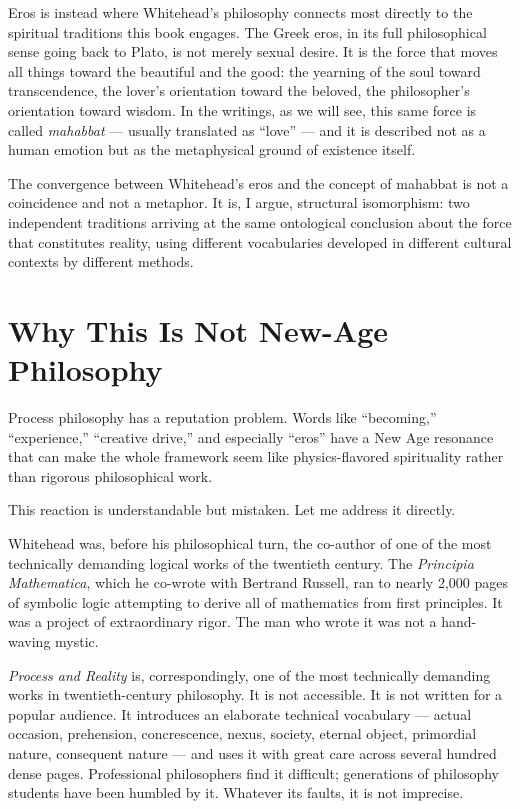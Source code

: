 Eros is instead where Whitehead's philosophy connects most directly to the spiritual traditions this book engages. The Greek eros, in its full philosophical sense going back to Plato, is not merely sexual desire. It is the force that moves all things toward the beautiful and the good: the yearning of the soul toward transcendence, the lover's orientation toward the beloved, the philosopher's orientation toward wisdom. In the \bahai writings, as we will see, this same force is called \textit{mahabbat} --- usually translated as ``love'' --- and it is described not as a human emotion but as the metaphysical ground of existence itself.

The convergence between Whitehead's eros and the \bahai concept of mahabbat is not a coincidence and not a metaphor. It is, I argue, structural isomorphism: two independent traditions arriving at the same ontological conclusion about the force that constitutes reality, using different vocabularies developed in different cultural contexts by different methods.

\section{Why This Is Not New-Age Philosophy}
\label{sec:ch2-not-newage}

Process philosophy has a reputation problem. Words like ``becoming,'' ``experience,'' ``creative drive,'' and especially ``eros'' have a New Age resonance that can make the whole framework seem like physics-flavored spirituality rather than rigorous philosophical work.

This reaction is understandable but mistaken. Let me address it directly.

Whitehead was, before his philosophical turn, the co-author of one of the most technically demanding logical works of the twentieth century. The \textit{Principia Mathematica}, which he co-wrote with Bertrand Russell, ran to nearly 2,000 pages of symbolic logic attempting to derive all of mathematics from first principles. It was a project of extraordinary rigor. The man who wrote it was not a hand-waving mystic.

\textit{Process and Reality} is, correspondingly, one of the most technically demanding works in twentieth-century philosophy. It is not accessible. It is not written for a popular audience. It introduces an elaborate technical vocabulary --- actual occasion, prehension, concrescence, nexus, society, eternal object, primordial nature, consequent nature --- and uses it with great care across several hundred dense pages. Professional philosophers find it difficult; generations of philosophy students have been humbled by it. Whatever its faults, it is not imprecise.

